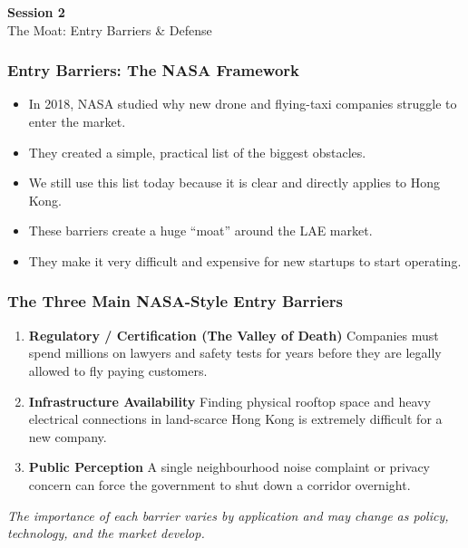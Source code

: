 \documentclass{beamer}
\begin{document}
\begin{frame}[c]
  \begin{center}
    \huge\color{cuhkpurple}\textbf{Session 2}\\
    \vspace{0.5cm}
    \Large The Moat: Entry Barriers \& Defense
  \end{center}
\end{frame}

\begin{frame}[t]
  \frametitle{Entry Barriers: The NASA Framework}
 
  \begin{itemize}
    \item In 2018, NASA studied why new drone and flying-taxi companies struggle to enter the market.
    \item They created a simple, practical list of the biggest obstacles.
    \item We still use this list today because it is clear and directly applies to Hong Kong.
    \item These barriers create a huge “moat” around the LAE market.
    \item They make it very difficult and expensive for new startups to start operating.
  \end{itemize}
\end{frame}

\begin{frame}[t]
  \frametitle{The Three Main NASA-Style Entry Barriers}
 
  \begin{enumerate}
    \item \textbf{Regulatory / Certification (The Valley of Death)}  
      Companies must spend millions on lawyers and safety tests for years before they are legally allowed to fly paying customers.
    
    \item \textbf{Infrastructure Availability}  
      Finding physical rooftop space and heavy electrical connections in land-scarce Hong Kong is extremely difficult for a new company.
    
    \item \textbf{Public Perception}  
      A single neighbourhood noise complaint or privacy concern can force the government to shut down a corridor overnight.
  \end{enumerate}
 
  \vspace{0.3cm}
  \textit{The importance of each barrier varies by application and may change as policy, technology, and the market develop.}
\end{frame}
\end{document}
